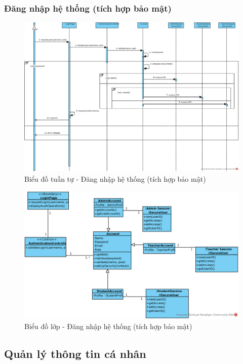 \documentclass[./../main.tex]{subfiles}
\begin{document}
\subsubsection{Đăng nhập hệ thống (tích hợp bảo mật)}
\begin{figure}[H]
    \centering
    \includegraphics[width=\linewidth]{./images/UseCaseDesignDiagram/ucr_sec_login.eps}
    \caption{Biểu đồ tuần tự - Đăng nhập hệ thống (tích hợp bảo mật)}
\end{figure}
\begin{figure}[H]
    \centering
    \includegraphics[width=\linewidth]{./images/UseCaseDesignDiagram/ucd_sec_login.eps}
    \caption{Biểu đồ lớp - Đăng nhập hệ thống (tích hợp bảo mật)}
\end{figure}

\subsection{Quản lý thông tin cá nhân}
\end{document}
